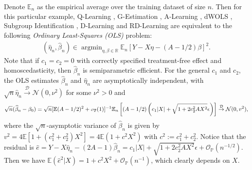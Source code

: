 \documentclass[11pt]{article}
\theoremstyle{definition}
\theoremstyle{remark}
\newcommand{\bbE}{\mathbb{E}}
\newcommand{\bbP}{\mathbb{P}}
\newcommand{\bbR}{\mathbb{R}}
\newcommand{\cD}{\mathcal{D}}
\newcommand{\cN}{\mathcal{N}}
\newcommand{\cO}{\mathcal{O}}
\newcommand\smallcO{
	\mathchoice
	{{\scriptscriptstyle\mathcal{O}}}%
	{{\scriptscriptstyle\mathcal{O}}}%
	{{\scriptscriptstyle\mathcal{O}}}%
	{\scalebox{.5}{$\scriptscriptstyle\mathcal{O}$}}%
}
\newcommand{\argmin}{\mathop{\mathrm{argmin}}}
\begin{document}
Denote $ \bbE_{n} $ as the empirical average over the training dataset of size $ n $. Then for this particular example,  Q-Learning \citep{watkins1989learning}, G-Estimation \citep{robins2004optimal}, A-Learning \citep{murphy2003optimal}, dWOLS \citep{wallace2015doubly}, Subgroup Identification \citep{tian2014simple}, D-Learning \citep{qi2018d} and RD-Learning \citep{meng2020robust} are equivalent to the following \textit{Ordinary Least-Squares (OLS)} problem:
\begin{align}
	(\widehat{\eta}_{n},\widehat{\beta}_{n}) \in \argmin_{\eta,\beta \in \bbR}\bbE_{n}[Y - X\eta - (A-1/2)\beta]^{2}.\label{eq:eg_ols}
\end{align}
Note that if $ c_{1} = c_{2} = 0 $ with correctly specified treatment-free effect and homoscedasticity, then $ \widehat{\beta}_{n} $ is semiparametric efficient. For the general $ c_{1} $ and $ c_{2} $, the OLS estimates $ \widehat{\beta}_{n} $ and $ \widehat{\eta}_{n} $ are asymptotically independent, with $ \sqrt{n}\widehat{\eta}_{n} \stackrel{\cD}{\to} \cN(0,\nu^{2}) $ for some $ \nu^{2} > 0 $ and
\[ \sqrt{n}(\widehat{\beta}_{n} - \beta_{0}) = \sqrt{n}[\bbE(A-1/2)^{2} +\smallcO_{\bbP}(1)]^{-1}\bbE_{n}\left[(A-1/2)\left(c_{1}|X| + \sqrt{1+2c_{2}^{2}AX^{2}}\epsilon\right)\right] \stackrel{\cD}{\to} \cN(0,v^{2}), \]
where the $ \sqrt{n} $-asymptotic variance of $ \widehat{\beta}_{n} $ is given by $ v^{2} = 4\bbE[1+(c_{1}^{2} + c_{2}^{2})X^{2}] = 4\bbE(1+c^{2}X^{2}) $ with $ c^{2} := c_{1}^{2} + c_{2}^{2} $. 
Notice that the residual is $ \widehat{e} = Y - X\widehat{\eta}_{n} - (2A-1)\widehat{\beta}_{n} = c_{1}|X| + \sqrt{1+2c_{2}^{2}AX^{2}}\epsilon + \cO_{\bbP}(n^{-1/2}) $. Then we have $ \bbE(\widehat{e}^{2}|X) = 1+c^{2}X^{2} + \cO_{\bbP}(n^{-1}) $, which clearly depends on $ X $.
\end{document}
